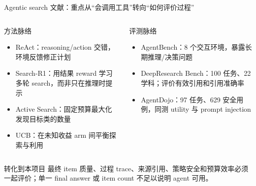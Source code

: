 \begin{frame}{Agentic search 文献：重点从“会调用工具”转向“如何评价过程”}
\small
\begin{columns}[T,onlytextwidth]
\begin{block}{方法脉络}
\begin{itemize}
  \item ReAct：reasoning/action 交错，环境反馈修正计划 \cite{yao2023react}
  \item Search-R1：用结果 reward 学习多轮 search，而非只在推理时提示 \cite{jin2025searchr1}
  \item Active Search：固定预算最大化发现目标类的数量 \cite{garnett2012active}
  \item UCB：在未知收益 arm 间平衡探索与利用 \cite{auer2002ucb}
\end{itemize}
\end{block}
\begin{block}{评测脉络}
\begin{itemize}
  \item AgentBench：8 个交互环境，暴露长期推理/决策问题 \cite{liu2024agentbench}
  \item DeepResearch Bench：100 任务、22 学科；评价有效引用和引用准确率 \cite{du2025deepresearchbench}
  \item AgentDojo：97 任务、629 安全用例，同测 utility 与 prompt injection \cite{debenedetti2024agentdojo}
\end{itemize}
\end{block}
\end{columns}

\begin{alertblock}{转化到本项目}
最终 item 质量、过程 trace、来源引用、策略安全和预算效率必须一起评价；单一 final answer 或 item count 不足以说明 agent 可用。
\end{alertblock}
\end{frame}


